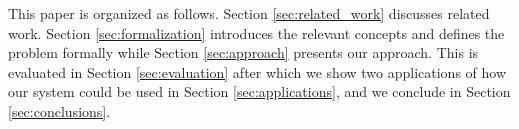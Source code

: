 

This paper is organized as follows.
Section \ref{sec:related_work} discusses related work. Section \ref{sec:formalization} introduces the relevant concepts and defines the problem formally while Section \ref{sec:approach} presents our approach. This is evaluated in Section \ref{sec:evaluation} after which we show two applications of how our system could be used in Section \ref{sec:applications}, and we conclude in Section \ref{sec:conclusions}.



